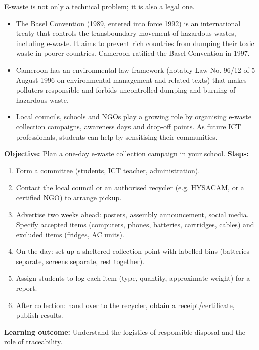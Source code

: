 \documentclass[11pt]{article}
\newcommand{\cle}[1]{{\popxbold\color{popdark}#1}}
\newcounter{popsec}
\newcounter{popsub}
\newcommand{\courssub}[1]{%
  \stepcounter{popsub}%
  \par\vspace{9pt}\noindent{\popxbold\fontsize{11.5}{13}\selectfont\color{popink}{\color{poporange}\thepopsec.\thepopsub}\hspace{6pt}#1}\par\nopagebreak\vspace{4pt}
}
\begin{document}
\courssub{Regulations and Initiatives}

E-waste is not only a technical problem; it is also a legal one.

\begin{itemize}
\item The \cle{Basel Convention} (1989, entered into force 1992) is an international treaty that controls the transboundary movement of hazardous wastes, including e-waste. It aims to prevent rich countries from dumping their toxic waste in poorer countries. Cameroon ratified the Basel Convention in 1997.
\item Cameroon has an \cle{environmental law framework} (notably Law No. 96/12 of 5 August 1996 on environmental management and related texts) that makes polluters responsible and forbids uncontrolled dumping and burning of hazardous waste.
\item \cle{Local councils}, schools and \cle{NGOs} play a growing role by organising e-waste collection campaigns, awareness days and drop-off points. As future ICT professionals, students can help by sensitising their communities.
\end{itemize}

\begin{experience}
\textbf{Objective:} Plan a one-day e-waste collection campaign in your school.
\textbf{Steps:}
\begin{enumerate}
\item Form a committee (students, ICT teacher, administration).
\item Contact the local council or an authorised recycler (e.g. HYSACAM, or a certified NGO) to arrange pickup.
\item Advertise two weeks ahead: posters, assembly announcement, social media. Specify accepted items (computers, phones, batteries, cartridges, cables) and excluded items (fridges, AC units).
\item On the day: set up a sheltered collection point with labelled bins (batteries separate, screens separate, rest together).
\item Assign students to log each item (type, quantity, approximate weight) for a report.
\item After collection: hand over to the recycler, obtain a receipt/certificate, publish results.
\end{enumerate}
\textbf{Learning outcome:} Understand the logistics of responsible disposal and the role of traceability.
\end{experience}
\end{document}
